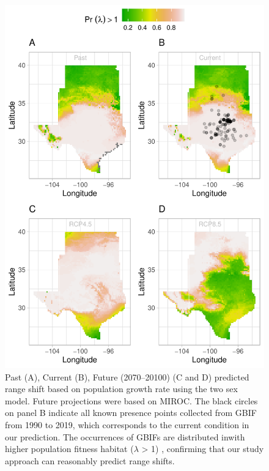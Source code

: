 \documentclass[12pt]{article}
\begin{document}
\begin{figure}[H]
  \begin{center}
    \includegraphics[width=0.75\linewidth]{Figures/Fig_geoPrlambdaprojection.pdf}
  \caption{Past (A), Current (B), Future (2070–20100) (C and D) predicted range shift based on population growth rate using the two sex model. Future projections were based on MIROC. The black circles on panel B indicate all known presence points collected from GBIF from 1990 to 2019, which corresponds to the current condition in our prediction.  The occurrences of GBIFs are distributed inwith higher population fitness habitat ($\lambda$ > 1) , confirming that our study approach can reasonably predict range shifts. }
  \label{fig:geoprojmiroc}
  \end{center}
\end{figure}
\end{document}
